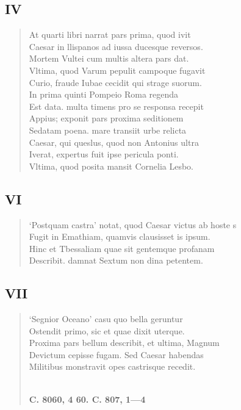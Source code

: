 \documentclass[11pt, a4paper]{report}
\begin{document}
            \subsection*{IV}
      \begin{verse}
      At quarti libri narrat pars prima, quod ivit \\ Caesar in llispanos ad iussa ducesque reversos. \\ Mortem Vultei cum multis altera pars dat. \\ Vltima, quod Varum pepulit campoque fugavit \\ Curio, fraude Iubae cecidit qui strage suorum. \\ In prima quinti Pompeio Roma regenda \\ Est data. multa timens pro se responsa recepit \\ Appius; exponit pars proxima seditionem \\ Sedatam poena. mare transiit urbe relicta \\ Caesar, qui queslus, quod non Antonius ultra \\ Iverat, expertus fuit ipse pericula ponti. \\ Vltima, quod posita mansit Cornelia Lesbo. \\ 
      \end{verse}
  
            \subsection*{VI}
      \begin{verse}
      ‘Postquam castra’ notat, quod Caesar victus ab hoste s \\ Fugit in Emathiam, quamvis clausisset is ipsum. \\ Hinc et Tbessaliam quae sit gentemque profanam \\ Describit. damnat Sextum non dina petentem. \\ 
      \end{verse}
  
            \subsection*{VII}
      \begin{verse}
      ‘Segnior Oceano’ casu quo bella geruntur \\ Ostendit primo, sic et quae dixit uterque. \\ Proxima pars bellum describit, et ultima, Magnum \\ Devictum cepisse fugam. Sed Caesar habendas \\ Militibus monstravit opes castrisque recedit. \\ 
        ﻿\pagebreak 
    \begin{center} \textbf{C. 8060, 4 60. C. 807, 1—4} \end{center} \marginpar{[281]} 
      \end{verse}
  
\end{document}
